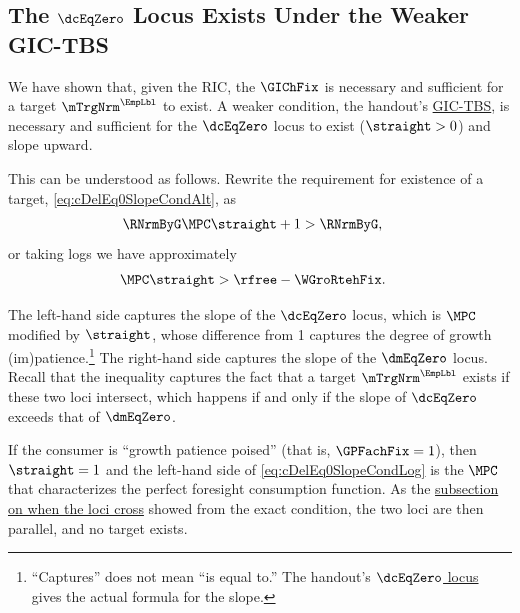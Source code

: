 \documentclass{econark}
\begin{document}
\subsection{The $\dcEqZero$ Locus Exists Under the Weaker GIC-TBS}\label{sec:TractableBufferStock-cLocusExists}

We have shown that, given the RIC, the $\GIChFix$ is necessary and sufficient for a target $\mTrgNrm^{\EmpLbl}$ to exist.  A weaker condition, the handout's \hyperref[eq:GICExistsSoln]{GIC-TBS}, is necessary and sufficient for the $\dcEqZero$ locus to exist ($\straight > 0$) and slope upward.

This can be understood as follows.  Rewrite the requirement for existence of a target, \eqref{eq:cDelEq0SlopeCondAlt}, as 
\begin{equation}\begin{gathered}\begin{aligned}
  \RNrmByG \MPC \straight+1 & >   \RNrmByG  \label{eq:cDelEq0SlopeCondAltAlt}
,\end{aligned}\end{gathered}\end{equation}
or taking logs we have approximately 
\begin{equation}\begin{gathered}\begin{aligned}
  \MPC \straight & >   \rfree-\WGroRtehFix \label{eq:cDelEq0SlopeCondLog}
.\end{aligned}\end{gathered}\end{equation}

The left-hand side captures the slope of the $\dcEqZero$ locus, which is $\MPC$ modified by $\straight$, whose difference from 1 captures the degree of growth (im)patience.\footnote{``Captures'' does not mean ``is equal to.''  The handout's \hyperref[eq:cDelEqZero]{$\dcEqZero$ locus} gives the actual formula for the slope.}  The right-hand side captures the slope of the $\dmEqZero$ locus.  Recall that the inequality captures the fact that a target $\mTrgNrm^{\EmpLbl}$ exists if these two loci intersect, which happens if and only if the slope of $\dcEqZero$ exceeds that of $\dmEqZero$.

If the consumer is ``growth patience poised'' (that is, $\GPFachFix = 1$), then $\straight = 1$ and the left-hand side of \eqref{eq:cDelEq0SlopeCondLog} is the $\MPC$ that characterizes the perfect foresight consumption function.  As the \hyperref[sec:TractableBufferStock-LociCross]{subsection on when the loci cross} showed from the exact condition, the two loci are then parallel, and no target exists.
\end{document}
